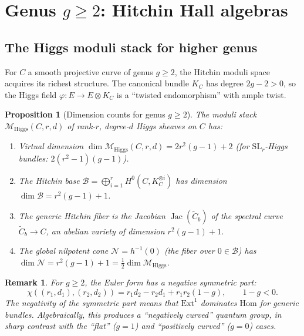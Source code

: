 \documentclass[11pt]{article}
\theoremstyle{garamondthm}
\newtheorem{proposition}[theorem]{Proposition}
\theoremstyle{garamonddef}
\theoremstyle{garamondrem}
\newtheorem{remark}[theorem]{Remark}
\newcommand{\Hom}{\mathrm{Hom}}
\newcommand{\Ext}{\mathrm{Ext}}
\newcommand{\cB}{\mathcal{B}}
\newcommand{\cM}{\mathcal{M}}
\newcommand{\cN}{\mathcal{N}}
\newcommand{\Higgs}{\mathrm{Higgs}}
\newcommand{\SL}{\mathrm{SL}}
\DeclareMathOperator{\Jac}{Jac}
\begin{document}

\section{Genus $g \geq 2$: Hitchin Hall algebras}
\label{sec:genus-geq-2}

\subsection{The Higgs moduli stack for higher genus}
\label{ssec:higgs-higher-genus}

For $C$ a smooth projective curve of genus $g \geq 2$, the Hitchin moduli space acquires its richest structure. The canonical bundle $K_C$ has degree $2g - 2 > 0$, so the Higgs field $\varphi \colon E \to E \otimes K_C$ is a ``twisted endomorphism'' with ample twist.

\begin{proposition}[Dimension counts for genus $g \geq 2$]
\label{prop:higgs-dim-higher-genus}
The moduli stack $\cM_{\Higgs}(C, r, d)$ of rank-$r$, degree-$d$ Higgs sheaves on $C$ has:
\begin{enumerate}[label=(\roman*)]
 \item Virtual dimension $\dim \cM_{\Higgs}(C, r, d) = 2r^2(g-1) + 2$ (for $\SL_r$-Higgs bundles: $2(r^2-1)(g-1)$).
 \item The Hitchin base $\cB = \bigoplus_{i=1}^r H^0(C, K_C^{\otimes i})$ has dimension $\dim \cB = r^2(g-1) + 1$.
 \item The generic Hitchin fiber is the Jacobian $\Jac(\widetilde{C}_b)$ of the spectral curve $\widetilde{C}_b \to C$, an abelian variety of dimension $r^2(g-1)+1$.
 \item The global nilpotent cone $\cN = h^{-1}(0)$ (the fiber over $0 \in \cB$) has $\dim \cN = r^2(g-1)+1 = \frac{1}{2}\dim \cM_{\Higgs}$.
\end{enumerate}
\end{proposition}

\begin{remark}
\label{rem:euler-form-higher-genus}
For $g \geq 2$, the Euler form has a \emph{negative} symmetric part:
\[
 \chi((r_1, d_1), (r_2, d_2)) = r_1 d_2 - r_2 d_1 + r_1 r_2(1 - g), \qquad 1 - g < 0.
\]
The negativity of the symmetric part means that $\Ext^1$ dominates $\Hom$ for generic bundles. Algebraically, this produces a ``negatively curved'' quantum group, in sharp contrast with the ``flat'' ($g = 1$) and ``positively curved'' ($g = 0$) cases.
\end{remark}
\end{document}
